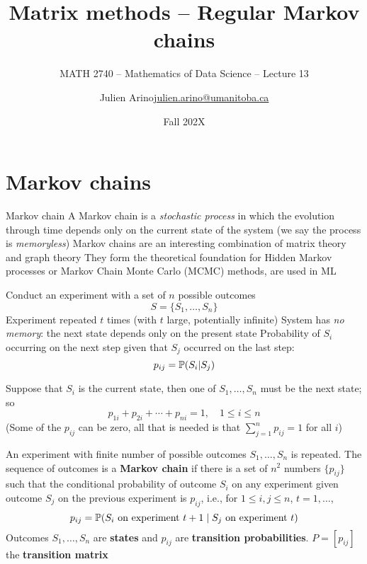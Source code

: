 \documentclass[aspectratio=169]{beamer}\usepackage[]{graphicx}\usepackage[]{xcolor}
\subtitle{MATH 2740 -- Mathematics of Data Science -- Lecture 13}
\author{\texorpdfstring{Julien Arino\newline\url{julien.arino@umanitoba.ca}}{Julien Arino}}
\institute{Department of Mathematics @ University of Manitoba}
\date{Fall 202X}
\title{Matrix methods -- Regular Markov chains}
\begin{document}
\setcounter{theorem}{89}



\section{Markov chains}

\begin{frame}{Markov chain}
	A Markov chain is a \emph{stochastic process} in which the evolution through time depends only on the current state of the system (we say the process is \emph{memoryless})
	\vfill
	Markov chains are an interesting combination of matrix theory and graph theory
	\vfill
	They form the theoretical foundation for Hidden Markov processes or Markov Chain Monte Carlo (MCMC) methods, are used in ML
\end{frame}



\begin{frame}
Conduct an experiment with a set of $n$ possible outcomes
\[
S=\{S_1,\dots, S_n\}
\]
\vfill
Experiment repeated $t$ times (with $t$ large, potentially infinite)
\vfill 
System has \emph{no memory}: the next state depends only on the present state
\vfill
Probability of $S_i$ occurring on the next step given that $S_j$ occurred on the last step:
\[
p_{ij}=\mathbb{P}(S_i|S_j)
\]
\end{frame}


\begin{frame} 
Suppose that $S_i$ is the current state, then one of $S_1, \ldots,S_n$ must be the next state; so
\[
p_{1i}+p_{2i}+\cdots+p_{ni}=1, \quad 1\leq i\leq n
\]
(Some of the $p_{ij}$ can be zero, all that is needed is that $\sum_{j=1}^n p_{ij}=1$ for all $i$)
\end{frame}

\begin{frame}
\begin{definition}
An experiment with finite number of possible outcomes $S_1,\ldots,S_n$ is repeated. The sequence of outcomes is a \textbf{Markov chain} if there is a set of $n^2$ numbers $\{p_{ij}\}$ such that the conditional probability of outcome $S_i$ on any experiment given outcome $S_j$ on the previous experiment is $p_{ij}$, i.e., for $1\leq i,j\leq n$, $t=1,\ldots$,
\[
	p_{ij}=\mathbb{P}(S_i\textrm{ on experiment }t+1\;|\;
	S_j\textrm{ on experiment }t)	
\]
Outcomes $S_1,\ldots,S_n$ are \textbf{states} and $p_{ij}$ are \textbf{transition probabilities}. $P=[p_{ij}]$ the \textbf{transition matrix}
\end{definition}
\end{frame}
\end{document}
